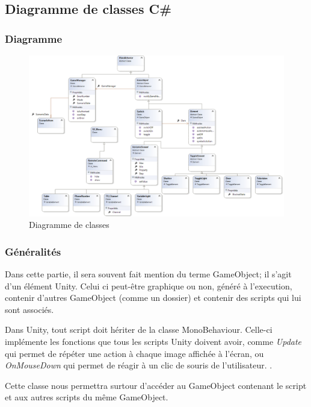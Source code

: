 \subsection{Diagramme de classes C\#}

\subsubsection{Diagramme}
\begin{figure}[h]
    \centering
    \includegraphics[width=\textwidth]{4-Conception/img/diagClasses.png}
    \caption{Diagramme de classes}
    \label{fig:class_diagram}
\end{figure}

\subsubsection{Généralités}
Dans cette partie, il sera souvent fait mention du terme GameObject; il s'agit d'un élément Unity. 
Celui ci peut-être graphique ou non, généré à l'execution, contenir d'autres GameObject (comme un dossier) et contenir des scripts qui lui sont associés.\newline

Dans Unity, tout script doit hériter de la classe MonoBehaviour. Celle-ci implémente les fonctions que tous les scripts Unity doivent avoir, comme \textit{Update} qui permet de répéter une action à chaque image affichée à l'écran, ou \textit{OnMouseDown} qui permet de réagir à un clic de souris de l'utilisateur. .\newline

Cette classe nous permettra surtour d'accéder au GameObject contenant le script et aux autres scripts du même GameObject.

